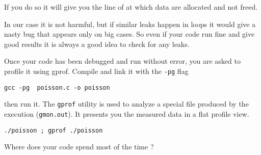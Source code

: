 \documentclass[11pt,a4paper]{article}
\begin{document}
\begin{exercise}[Debugging]
\begin{itemize}
\begin{itemize}
      If you do so it will give you the line of at which data are allocated and
      not freed.

      In our case it is not harmful, but if similar leaks happen in loops it
      would give a nasty bug that appears only on big cases. So even if your
      code run fine and give good results it is always a good idea to check for
      any leaks.
    \end{itemize}
  \end{itemize}
\end{exercise}



\begin{exercise}
Once your code has been debugged and run without error, you are asked to profile it using gprof. Compile and link it with the {\tt -pg} flag

\begin{verbatim}
gcc -pg  poisson.c -o poisson
\end{verbatim}

then run it. The {\tt gprof} utility is used to analyze a special file produced by the execution ({\tt gmon.out}). It presents you the measured data in a flat profile view.

\begin{verbatim}
./poisson ; gprof ./poisson
\end{verbatim}

Where does your code spend most of the time ?

\end{exercise}

\end{document}
